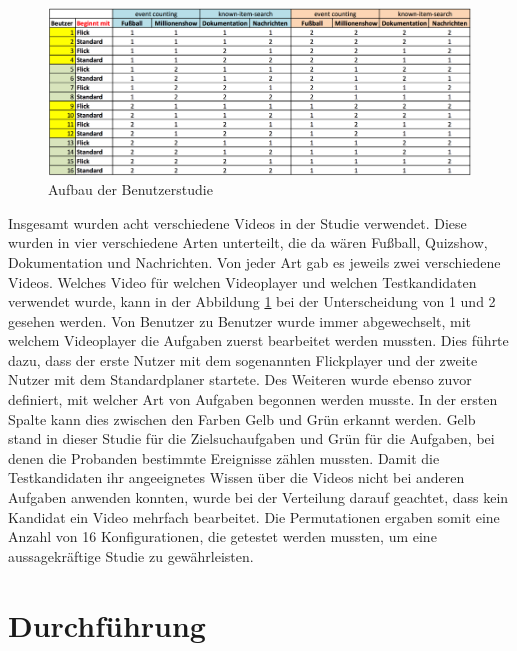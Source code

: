 \documentclass[11pt,a4paper]{report}
\begin{document}
\begin{figure}[h]
\begin{center}
\includegraphics[scale=0.9]{./images/32.png}
\caption{Aufbau der Benutzerstudie}
\label{aufbau_studie}
\end{center}
\end{figure}
Insgesamt wurden acht verschiedene Videos in der Studie verwendet. Diese wurden in vier verschiedene Arten unterteilt, die da wären Fußball, Quizshow, Dokumentation und Nachrichten. Von jeder Art gab es jeweils zwei verschiedene Videos. Welches Video für welchen Videoplayer und welchen Testkandidaten verwendet wurde, kann in der Abbildung \ref{aufbau_studie} bei der Unterscheidung von 1 und 2 gesehen werden. Von Benutzer zu Benutzer wurde immer abgewechselt, mit welchem Videoplayer die Aufgaben zuerst bearbeitet werden mussten. Dies führte dazu, dass der erste Nutzer mit dem sogenannten Flickplayer und der zweite Nutzer mit dem Standardplaner startete. Des Weiteren wurde ebenso zuvor definiert, mit welcher Art von Aufgaben begonnen werden musste. In der ersten Spalte kann dies zwischen den Farben Gelb und Grün erkannt werden. Gelb stand in dieser Studie für die Zielsuchaufgaben und Grün für die Aufgaben, bei denen die Probanden bestimmte Ereignisse zählen mussten. Damit die Testkandidaten ihr angeeignetes Wissen über die Videos nicht bei anderen Aufgaben anwenden konnten, wurde bei der Verteilung darauf geachtet, dass kein Kandidat ein Video mehrfach bearbeitet. Die Permutationen ergaben somit eine Anzahl von 16 Konfigurationen, die getestet werden mussten, um eine aussagekräftige Studie zu gewährleisten.

\section{Durchführung}
\end{document}
